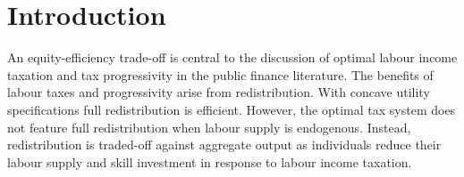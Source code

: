 
\section{Introduction}
An equity-efficiency trade-off is central to the discussion of optimal labour income taxation and tax progressivity in the public finance literature.  The benefits of labour taxes and progressivity arise from redistribution. With concave utility specifications full redistribution is efficient. However, the optimal tax system does not feature full redistribution when labour supply is endogenous. Instead, redistribution is traded-off against aggregate output as individuals reduce their labour supply and skill investment in response to labour income taxation. 


